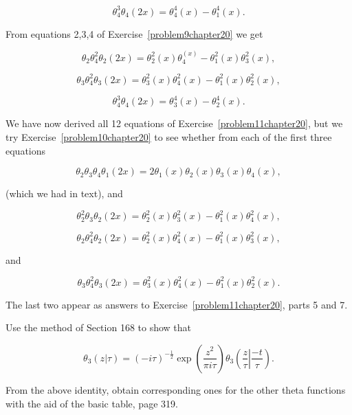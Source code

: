 \begin{solution}
$$\theta_4^3 \theta_4(2x) = \theta_4^4(x) - \theta_1^4(x).$$

From equations 2,3,4 of Exercise~\ref{problem9chapter20} we get

$$\theta_2 \theta_4^2 \theta_2(2x) = \theta_2^2(x) \theta_4^(x) - \theta_1^2(x) \theta_3^2(x),$$

$$\theta_3 \theta_4^2\theta_3(2x) = \theta_3^2(x) \theta_4^2(x) - \theta_1^2(x) \theta_2^2(x),$$

$$\theta_4^3 \theta_4(2x) = \theta_3^4(x) - \theta_2^4(x).$$

We have now derived all 12 equations of Exercise~\ref{problem11chapter20}, but we try Exercise~\ref{problem10chapter20} to see whether from each of the first three equations

$$\theta_2\theta_3\theta_4 \theta_1(2x) = 2 \theta_1(x) \theta_2(x) \theta_3(x) \theta_4(x),$$

(which we had in text), and

$$\theta_2^2 \theta_3 \theta_2(2x) = \theta_2^2(x) \theta_3^2(x) - \theta_1^2(x) \theta_4^2(x),$$

$$\theta_2 \theta_4^2 \theta_2(2x) = \theta_2^2(x) \theta_4^2(x) - \theta_1^2(x) \theta_3^2(x),$$

and

$$\theta_3 \theta_4^2 \theta_3(2x) = \theta_3^2(x) \theta_4^2(x) - \theta_1^2(x) \theta_2^2(x).$$

The last two appear as answers to Exercise~\ref{problem11chapter20}, parts 5 and 7.
\end{solution}
\begin{problem}\label{problem12chapter20}
Use the method of Section 168 to show that

$$\theta_3(z|\tau) = (-i \tau)^{-\frac{1}{2}} \exp \left( \dfrac{z^2}{\pi i \tau} \right) \theta_3 \left( \left. \dfrac{z}{\tau} \right| \dfrac{-t}{\tau} \right).$$

From the above identity, obtain corresponding ones for the other theta functions with the aid of the basic table, page 319.
\end{problem}
